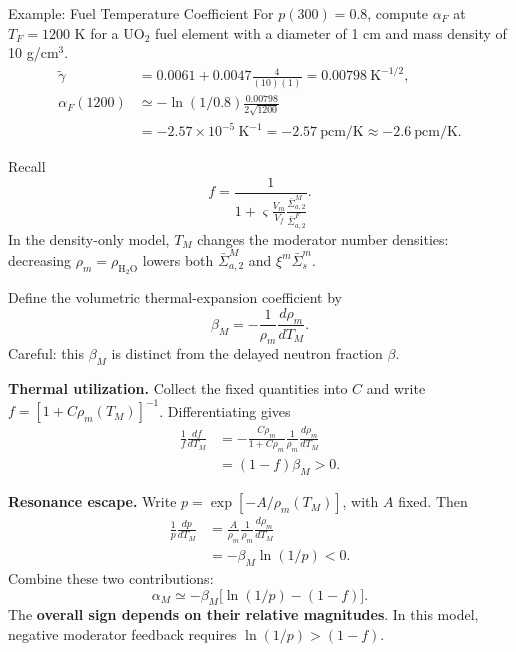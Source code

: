 \documentclass[compact]{ne630handout}
\begin{document}
\begin{KeyBox}{Example: Fuel Temperature Coefficient}
For $p(300)=0.8$, compute $\alpha_F$ at $T_F=1200$ K for a UO$_2$ fuel
element with a diameter of 1 cm and mass density of 10 g/cm$^3$.
\begin{align*}
 \tilde\gamma
 &=0.0061+0.0047\frac4{(10)(1)}
 =0.00798\ \mathrm{K}^{-1/2},\\
 \alpha_F(1200)
 &\simeq-\ln(1/0.8)\frac{0.00798}{2\sqrt{1200}}\\
 &=-2.57\times10^{-5}\ \mathrm{K}^{-1}
 =-2.57\ \mathrm{pcm/K}\approx\boxed{-2.6\ \mathrm{pcm/K}}.
\end{align*}
\end{KeyBox}



\colnext
{}
Recall
$$
 f=\frac1{1+\varsigma\displaystyle\frac{V_m}{V_f}
 \displaystyle\frac{\bar\Sigma^M_{a,2}}{\bar\Sigma^F_{a,2}}}.
$$
In the density-only model, $T_M$ changes the moderator number densities: decreasing $\rho_m=\rho_{\mathrm{H_2O}}$ lowers both $\bar\Sigma^M_{a,2}$ and $\xi^m\bar\Sigma_s^m$.

Define the volumetric thermal-expansion coefficient by
$$
 \beta_M=-\frac1{\rho_m}\frac{d\rho_m}{dT_M}.
$$
Careful: this $\beta_M$ is distinct from the delayed neutron fraction $\beta$.

\vspace{6pt}

\textbf{Thermal utilization.} Collect the fixed quantities into $C$ and write $f=[1+C\rho_m(T_M)]^{-1}$. Differentiating gives
\begin{align*}
 \frac1f\frac{df}{dT_M}
 &=-\frac{C\rho_m}{1+C\rho_m}
   \frac1{\rho_m}\frac{d\rho_m}{dT_M}\\
 &=(1-f)\beta_M>0.
\end{align*}

\vspace{6pt}

\textbf{Resonance escape.} Write $p=\exp[-A/\rho_m(T_M)]$, with $A$ fixed.  Then
\begin{align*}
 \frac1p\frac{dp}{dT_M}
 &=\frac{A}{\rho_m}\frac1{\rho_m}\frac{d\rho_m}{dT_M}\\
 &=-\beta_M\ln(1/p)<0.
\end{align*}
Combine these two contributions:
$$
 \boxed{\alpha_M\simeq-\beta_M\big[\ln(1/p)-(1-f)\big].}
$$
The \textbf{overall sign depends on their relative magnitudes}. In this model, negative moderator feedback requires $\ln(1/p)>(1-f)$.
\end{document}
